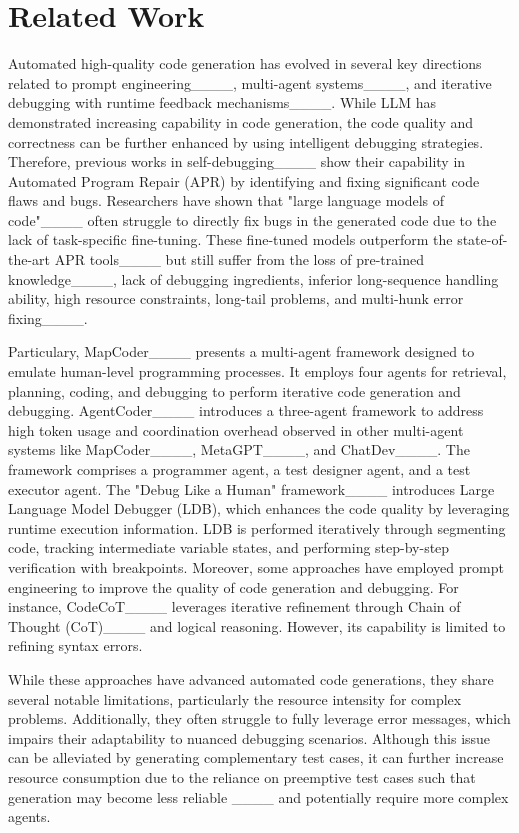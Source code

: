 \section{Related Work}
\label{lit}
Automated high-quality code generation has evolved in several key directions related to prompt engineering____, multi-agent systems____, and iterative debugging with runtime feedback mechanisms____.
While LLM has demonstrated increasing capability in code generation, the code quality and correctness can be further enhanced by using intelligent debugging strategies.
Therefore, previous works in self-debugging____ show their capability in Automated Program Repair (APR) by identifying and fixing significant code flaws and bugs.
Researchers have shown that "large language models of code"____ often struggle to directly fix bugs in the generated code due to the lack of task-specific fine-tuning. 
These fine-tuned models outperform the state-of-the-art APR tools____ but still suffer from the loss of pre-trained knowledge____, lack of debugging ingredients, inferior long-sequence handling ability, high resource constraints, long-tail problems, and multi-hunk error fixing____.

Particulary, MapCoder____ presents a multi-agent framework designed to emulate human-level programming processes. 
It employs four agents for retrieval, planning, coding, and debugging to perform iterative code generation and debugging.
AgentCoder____ introduces a three-agent framework to address high token usage and coordination overhead observed in other multi-agent systems like MapCoder____, MetaGPT____, and ChatDev____.
The framework comprises a programmer agent, a test designer agent, and a test executor agent.
The "Debug Like a Human" framework____ introduces Large Language Model Debugger (LDB), which enhances the code quality by leveraging runtime execution information. 
LDB is performed iteratively through segmenting code, tracking intermediate variable states, and performing step-by-step verification with breakpoints.
Moreover, some approaches have employed prompt engineering to improve the quality of code generation and debugging.
For instance,  CodeCoT____ leverages iterative refinement through Chain of Thought (CoT)____ and logical reasoning. 
However, its capability is limited to refining syntax errors.

While these approaches have advanced automated code generations, they share several notable limitations, particularly the resource intensity for complex problems. 
Additionally, they often struggle to fully leverage error messages, which impairs their adaptability to nuanced debugging scenarios. 
Although this issue can be alleviated by generating complementary test cases, it can further increase resource consumption due to the reliance on preemptive test cases such that generation may become less reliable ____ and potentially require more complex agents.

